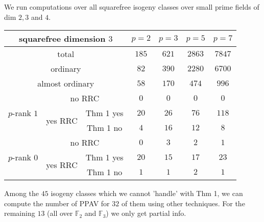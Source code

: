 \documentclass[usenames,dvipsnames]{beamer}
\def\F{\mathbb{F}}
\begin{document}
\begin{frame}{ }
	We run computations over all squarefree isogeny classes over small prime fields of dim $2,3$ and $4$. 
	\pause 
	\begin{table}[ht]
	    \centering
	    \small
	    \begin{tabular}{|c|c|c|c|c|c|c|}\hline
	\multicolumn{3}{|c|}{squarefree dimension $3$}                  & $p=2$ & $p=3$ & $p=5$ & $p=7$ \\\hline
	\multicolumn{3}{|c|}{total}                                     & $185$ & $621$  & $2863$ & $7847$ \\\hline                    
	\multicolumn{3}{|c|}{ordinary}                                  & $82$ & $390$  & $2280$  & $6700$ \\\hline
	\multicolumn{3}{|c|}{almost ordinary}                           & $58$ & $170$  & $474$  & $996$  \\\hline
	\multirow{3}{*}{$p$-rank $1$} & \multicolumn{2}{|c|}{no RRC}    & $0$ & $0$   & $0$   & $0$   \\\cline{2-7}
	                              & \multirow{2}{*}{yes RRC} & Thm 1 yes & $20$ & $26$   & $76$   & $118$   \\\cline{3-7}
	                              &                          & Thm 1 no  & $4$ & $16$   & $12$   & $8$   \\\hline
	\multirow{3}{*}{$p$-rank $0$}   & \multicolumn{2}{|c|}{no RRC}    & $0$ & $3$   & $2$   & $1$   \\\cline{2-7}
	                              & \multirow{2}{*}{yes RRC} & Thm 1 yes & $20$ & $15$   & $17$   & $23$   \\\cline{3-7}
	                              &                          & Thm 1 no  & $1$ & $1$   & $2$   & $1$   \\\hline                              
	    \end{tabular}
	\end{table}
    \pause Among the $45$ isogeny classes which we cannot 'handle' with Thm 1, we can compute the number of PPAV for $32$ of them using other techniques. For the remaining $13$ (all over $\F_2$ and $\F_3$) we only get partial info.
\end{frame}
\end{document}
